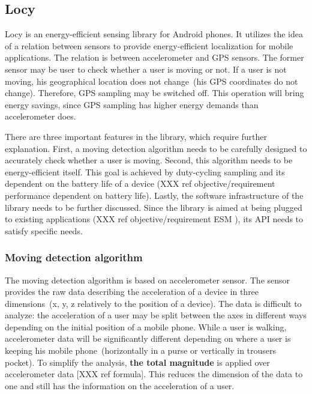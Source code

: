 \subsection{Locy}
\label{s:design:locy}

Locy is an energy-efficient sensing library for Android phones. It utilizes the idea of a relation between sensors to provide energy-efficient localization for mobile applications. The relation is between accelerometer and GPS sensors. The former sensor may be user to check whether a user is moving or not. If a user is not moving, his geographical location does not change\ (his GPS coordinates do not change). Therefore, GPS sampling may be switched off. This operation will bring energy savings, since GPS sampling has higher energy demands than accelerometer does. 

There are three important features in the library, which require further explanation. First, a moving detection algorithm needs to be carefully designed to accurately check whether a user is moving. Second, this algorithm needs to be energy-efficient itself. This goal is achieved by duty-cycling sampling and its dependent on the battery life of a device (XXX ref objective/requirement performance dependent on battery life). Lastly, the software infrastructure of the library needs to be further discussed. Since the library is aimed at being plugged to existing applications (XXX ref objective/requirement ESM ), its API needs to satisfy specific needs. 

\subsubsection{Moving detection algorithm}
\label{s:design:locy:moving}
The moving detection algorithm is based on accelerometer sensor. The sensor provides the raw data describing the acceleration of a device in three dimensions\ (x, y, z relatively to the position of a device).  The data is difficult to analyze: the acceleration of a user may be split between the axes in different ways depending on the initial position of a mobile phone. While a user is walking, accelerometer data will be significantly different depending on where a user is keeping his mobile phone\ (horizontally in a purse or vertically in trousers pocket). To simplify the analysis, \textbf{the total magnitude} is applied over accelerometer data [XXX ref formula]. This reduces the dimension of the data to one and still has the information on the acceleration of a user. 

